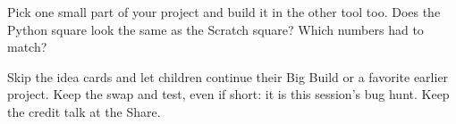 \begin{stretchchallenge}
Pick one small part of your project and build it in the other tool too. Does the Python square look the same as the Scratch square? Which numbers had to match?
\end{stretchchallenge}

\begin{teachernote}
Skip the idea cards and let children continue their Big Build or a favorite earlier project. Keep the swap and test, even if short: it is this session's bug hunt. Keep the credit talk at the Share.
\end{teachernote}
